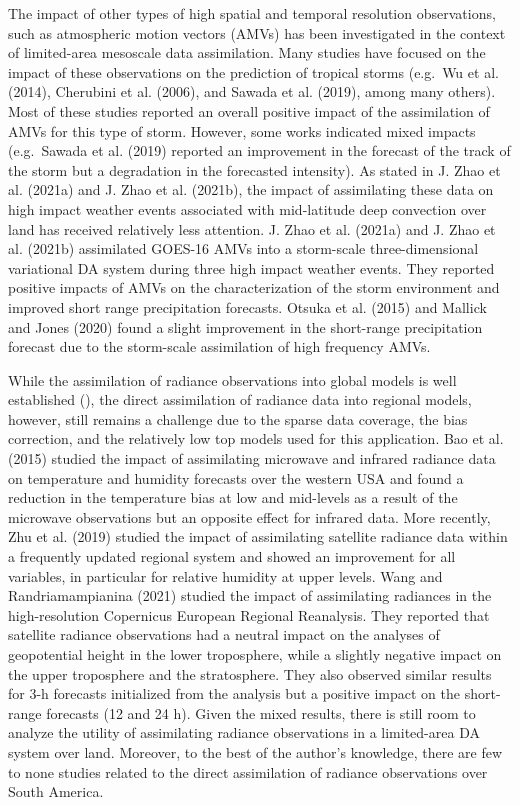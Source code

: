 \documentclass[final,5p,times,twocolumn,authoryear]{elsarticle} %
\begin{document}
The impact of other types of high spatial and temporal resolution observations, such as atmospheric motion vectors (AMVs) has been investigated in the context of limited-area mesoscale data assimilation. Many studies have focused on the impact of these observations on the prediction of tropical storms (e.g.~Wu et al. (2014), Cherubini et al. (2006), and Sawada et al. (2019), among many others). Most of these studies reported an overall positive impact of the assimilation of AMVs for this type of storm. However, some works indicated mixed impacts (e.g.~Sawada et al. (2019) reported an improvement in the forecast of the track of the storm but a degradation in the forecasted intensity). As stated in J. Zhao et al. (2021a) and J. Zhao et al. (2021b), the impact of assimilating these data on high impact weather events associated with mid-latitude deep convection over land has received relatively less attention. J. Zhao et al. (2021a) and J. Zhao et al. (2021b) assimilated GOES-16 AMVs into a storm-scale three-dimensional variational DA system during three high impact weather events. They reported positive impacts of AMVs on the characterization of the storm environment and improved short range precipitation forecasts. Otsuka et al. (2015) and Mallick and Jones (2020) found a slight improvement in the short-range precipitation forecast due to the storm-scale assimilation of high frequency AMVs.

While the assimilation of radiance observations into global models is well established (), the direct assimilation of radiance data into regional models, however, still remains a challenge due to the sparse data coverage, the bias correction, and the relatively low top models used for this application. Bao et al. (2015) studied the impact of assimilating microwave and infrared radiance data on temperature and humidity forecasts over the western USA and found a reduction in the temperature bias at low and mid-levels as a result of the microwave observations but an opposite effect for infrared data. More recently, Zhu et al. (2019) studied the impact of assimilating satellite radiance data within a frequently updated regional system and showed an improvement for all variables, in particular for relative humidity at upper levels. Wang and Randriamampianina (2021) studied the impact of assimilating radiances in the high-resolution Copernicus European Regional Reanalysis. They reported that satellite radiance observations had a neutral impact on the analyses of geopotential height in the lower troposphere, while a slightly negative impact on the upper troposphere and the stratosphere. They also observed similar results for 3-h forecasts initialized from the analysis but a positive impact on the short-range forecasts (12 and 24 h). Given the mixed results, there is still room to analyze the utility of assimilating radiance observations in a limited-area DA system over land. Moreover, to the best of the author's knowledge, there are few to none studies related to the direct assimilation of radiance observations over South America.
\end{document}

